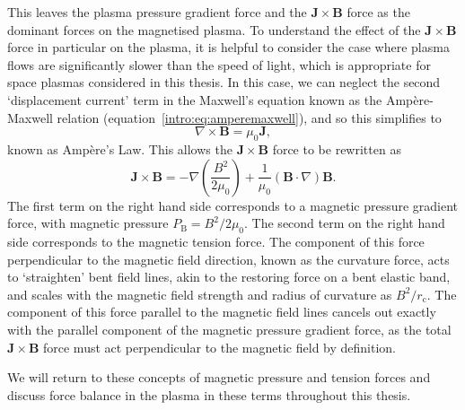 This leaves the plasma pressure gradient force and the $\boldsymbol{J}\times\boldsymbol{B}$ force as the dominant forces on the magnetised plasma. To understand the effect of the $\boldsymbol{J}\times\boldsymbol{B}$ force in particular on the plasma, it is helpful to consider the case where plasma flows are significantly slower than the speed of light, which is appropriate for space plasmas considered in this thesis. In this case, we can neglect the second `displacement current' term in the Maxwell's equation known as the Amp\`ere-Maxwell relation (equation~\ref{intro:eq:amperemaxwell}), and so this simplifies to 
\begin{equation}\label{intro:eq:ampere}
\nabla \times \boldsymbol{B} = \mu_0 \boldsymbol{J}, 
\end{equation}
known as Amp\`ere's Law. This allows the $\boldsymbol{J}\times\boldsymbol{B}$ force to be rewritten as
\begin{equation}\label{intro:eq:bpressuretension}
\boldsymbol{J}\times\boldsymbol{B} = -\nabla\left(\frac{B^2}{2\mu_0}\right)+\frac{1}{\mu_0}(\boldsymbol{B}\cdot\nabla)\boldsymbol{B}.
\end{equation}
The first term on the right hand side corresponds to a magnetic pressure gradient force, with magnetic pressure $P_\mathrm{B} = B^2/2\mu_0$. The second term on the right hand side corresponds to the magnetic tension force. The component of this force perpendicular to the magnetic field direction, known as the curvature force, acts to `straighten' bent field lines, akin to the restoring force on a bent elastic band, and scales with the magnetic field strength and radius of curvature as $B^2/r_\mathrm{c}$. The component of this force parallel to the magnetic field lines cancels out exactly with the parallel component of the magnetic pressure gradient force, as the total $\boldsymbol{J}\times\boldsymbol{B}$ force must act perpendicular to the magnetic field by definition.

We will return to these concepts of magnetic pressure and tension forces and discuss force balance in the plasma in these terms throughout this thesis.

